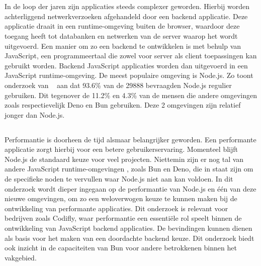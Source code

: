 
\chapter{}%
\label{ch:inleiding}


In de loop der jaren zijn applicaties steeds complexer geworden. Hierbij worden achterliggend netwerkverzoeken afgehandeld door een backend applicatie. Deze applicatie draait in een runtime-omgeving buiten de browser, 
waardoor deze toegang heeft tot databanken en netwerken van de server waarop het wordt uitgevoerd.
Een manier om zo een backend te ontwikkelen is met behulp van JavaScript, 
een programmeertaal die zowel voor server als client toepassingen kan gebruikt worden.
Backend JavaScript applicaties worden dan uitgevoerd in een JavaScript runtime-omgeving.
De meest populaire omgeving is Node.js. Zo toont onderzoek van ~\textcite{Greif2022} aan dat 93.6\% van de 29888 bevraagden Node.js 
regulier gebruiken.
Dit tegenover de 11.2\% en 4.3\% van de mensen die andere omgevingen zoals respectievelijk Deno en Bun gebruiken.
Deze 2 omgevingen zijn relatief jonger dan Node.js.

\section{}%
\label{sec:probleemstelling}

Performantie is doorheen de tijd alsmaar belangrijker geworden. 
Een performante applicatie zorgt hierbij voor een betere gebruikerservaring. 
Momenteel blijft Node.js de standaard keuze voor veel projecten. Niettemin zijn er nog tal van andere JavaScript runtime-omgevingen
, zoals Bun en Deno, die in staat zijn om de specifieke noden te vervullen waar Node.js niet aan kan voldoen. 
In dit onderzoek wordt dieper ingegaan op de performantie van Node.js en één van deze nieuwe omgevingen,
om zo een weloverwogen keuze te kunnen maken bij de ontwikkeling van performante applicaties.
Dit onderzoek is relevant voor bedrijven zoals Codifly, waar performantie een essentiële rol speelt binnen de ontwikkeling van JavaScript backend applicaties.
De bevindingen kunnen dienen als basis 
voor het maken van een doordachte backend keuze. Dit onderzoek 
biedt ook inzicht in de capaciteiten van Bun voor andere betrokkenen binnen het vakgebied.


